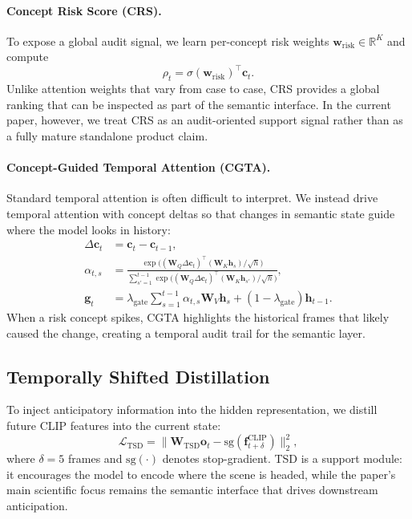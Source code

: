 \paragraph{Concept Risk Score (CRS).}
To expose a global audit signal, we learn per-concept risk weights
$\mathbf{w}_{\text{risk}} \in \mathbb{R}^K$ and compute
\begin{equation}
  \rho_t = \sigma(\mathbf{w}_{\text{risk}})^\top \mathbf{c}_t.
  \label{eq:crs}
\end{equation}
Unlike attention weights that vary from case to case, CRS provides a global
ranking that can be inspected as part of the semantic interface. In the current
paper, however, we treat CRS as an audit-oriented support signal rather than as
a fully mature standalone product claim.

\paragraph{Concept-Guided Temporal Attention (CGTA).}
Standard temporal attention is often difficult to interpret. We instead drive
temporal attention with concept deltas so that changes in semantic state guide
where the model looks in history:
\begin{align}
  \Delta\mathbf{c}_t &= \mathbf{c}_t - \mathbf{c}_{t-1}, \\
  \alpha_{t,s} &=
    \frac{\exp\bigl((\mathbf{W}_Q\Delta\mathbf{c}_t)^\top
      (\mathbf{W}_K\mathbf{h}_s)/\sqrt{h}\bigr)}
    {\sum_{s'=1}^{t-1}\exp\bigl((\mathbf{W}_Q\Delta\mathbf{c}_t)^\top
      (\mathbf{W}_K\mathbf{h}_{s'})/\sqrt{h}\bigr)}, \\
  \mathbf{g}_t &= \lambda_{\text{gate}}\sum_{s=1}^{t-1}\alpha_{t,s}\mathbf{W}_V\mathbf{h}_s
    + (1-\lambda_{\text{gate}})\mathbf{h}_{t-1}.
\end{align}
When a risk concept spikes, CGTA highlights the historical frames that likely
caused the change, creating a temporal audit trail for the semantic layer.

\subsection{Temporally Shifted Distillation}

To inject anticipatory information into the hidden representation, we distill
future CLIP features into the current state:
\begin{equation}
  \mathcal{L}_{\text{TSD}}
  = \bigl\|\mathbf{W}_{\text{TSD}}\mathbf{o}_t
    - \mathrm{sg}(\mathbf{f}^{\text{CLIP}}_{t+\delta})\bigr\|_2^2,
  \label{eq:tsd}
\end{equation}
where $\delta{=}5$ frames and $\mathrm{sg}(\cdot)$ denotes stop-gradient.
TSD is a support module: it encourages the model to encode where the scene is
headed, while the paper's main scientific focus remains the semantic interface
that drives downstream anticipation.

